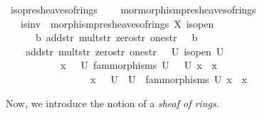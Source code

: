 \documentclass[12pt]{scrartcl}
\begin{document}
\begin{isabelle}
\isamarkupfalse%
\ iso{\isacharunderscore}{\kern0pt}presheaves{\isacharunderscore}{\kern0pt}of{\isacharunderscore}{\kern0pt}rings\ \isanewline
\ \ {\isacharequal}{\kern0pt}\ mor{\isacharcolon}{\kern0pt}morphism{\isacharunderscore}{\kern0pt}presheaves{\isacharunderscore}{\kern0pt}of{\isacharunderscore}{\kern0pt}rings\ {\isacharplus}{\kern0pt}\ \isanewline
\ \ \ is{\isacharunderscore}{\kern0pt}inv{\isacharcolon}{\kern0pt}\ {\isachardoublequoteopen}{\isasymexists}{\isasympsi}{\isachardot}{\kern0pt}\ morphism{\isacharunderscore}{\kern0pt}presheaves{\isacharunderscore}{\kern0pt}of{\isacharunderscore}{\kern0pt}rings\ X\ is{\isacharunderscore}{\kern0pt}open\ \isanewline
\ \ \ \ {\isasymFF}{\isacharprime}{\kern0pt}\ {\isasymrho}{\isacharprime}{\kern0pt}\ b{\isacharprime}{\kern0pt}\ add{\isacharunderscore}{\kern0pt}str{\isacharprime}{\kern0pt}\ mult{\isacharunderscore}{\kern0pt}str{\isacharprime}{\kern0pt}\ zero{\isacharunderscore}{\kern0pt}str{\isacharprime}{\kern0pt}\ one{\isacharunderscore}{\kern0pt}str{\isacharprime}{\kern0pt}\ {\isasymFF}\ {\isasymrho}\ b\ \isanewline
\ \ \ \ add{\isacharunderscore}{\kern0pt}str\ mult{\isacharunderscore}{\kern0pt}str\ zero{\isacharunderscore}{\kern0pt}str\ one{\isacharunderscore}{\kern0pt}str\ {\isasympsi}\ {\isasymand}\ {\isacharparenleft}{\kern0pt}{\isasymforall}U{\isachardot}{\kern0pt}\ is{\isacharunderscore}{\kern0pt}open\ U\ \isanewline
\ \ \ \ \ \ \ \ \ \ {\isasymlongrightarrow}\ {\isacharparenleft}{\kern0pt}{\isasymforall}x\ {\isasymin}\ {\isacharparenleft}{\kern0pt}{\isasymFF}{\isacharprime}{\kern0pt}\ U{\isacharparenright}{\kern0pt}{\isachardot}{\kern0pt}\ {\isacharparenleft}{\kern0pt}fam{\isacharunderscore}{\kern0pt}morphisms\ U\ {\isasymcirc}\ {\isasympsi}\ U{\isacharparenright}{\kern0pt}\ x\ {\isacharequal}{\kern0pt}\ x{\isacharparenright}{\kern0pt}\ \isanewline
\ \ \ \ \ \ \ \ \ \ \ \ \ \ \ \ {\isasymand}\ {\isacharparenleft}{\kern0pt}{\isasymforall}x\ {\isasymin}\ {\isacharparenleft}{\kern0pt}{\isasymFF}\ U{\isacharparenright}{\kern0pt}{\isachardot}{\kern0pt}\ {\isacharparenleft}{\kern0pt}{\isasympsi}\ U\ {\isasymcirc}\ fam{\isacharunderscore}{\kern0pt}morphisms\ U{\isacharparenright}{\kern0pt}\ x\ {\isacharequal}{\kern0pt}\ x{\isacharparenright}{\kern0pt}{\isacharparenright}{\kern0pt}{\isachardoublequoteclose}
\end{isabelle}

Now, we introduce the notion of a \emph{sheaf of rings}. 			
\end{document}
